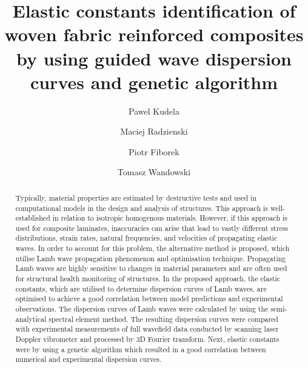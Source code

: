 	\begin{frontmatter}
		
		
		
		
		
		
		
		
		
		
		
		
		
		
		
		
		
		
		
		\title{Elastic constants identification of woven fabric reinforced composites by using guided wave dispersion curves and genetic algorithm}
		
		
		
		\address[IFFM]{Institute of Fluid Flow Machinery, Polish Academy of Sciences, Poland}
		
		\author{Pawel Kudela}
		\author{Maciej Radzienski}
		\author{Piotr Fiborek }
		
		\author{Tomasz Wandowski }	
		
		
		\begin{abstract}
			
		Typically, material properties are estimated by destructive tests and used in computational models in the design and analysis of structures. This approach is well-established in relation to isotropic homogenous materials. However, if this approach is used for composite laminates, inaccuracies can arise that lead to vastly different stress distributions, strain rates, natural frequencies, and velocities of propagating elastic waves. In order to account for this problem, the alternative method is proposed, which utilise Lamb wave propagation phenomenon and optimisation technique. Propagating Lamb waves are highly sensitive to changes in material parameters and are often used for structural health monitoring of structures. In the proposed approach, the elastic constants, which are utilised to determine dispersion curves of Lamb waves, are optimised to achieve a good correlation between model predictions and experimental observations. The dispersion curves of Lamb waves were calculated by using the semi-analytical spectral element method. The resulting dispersion curves were compared with experimental measurements of full wavefield data conducted by scanning laser Doppler vibrometer and processed by 3D Fourier transform. Next, elastic constants were   by using a genetic algorithm which resulted in a good correlation between numerical and experimental dispersion curves.
		\end{abstract}
		

\end{frontmatter}
